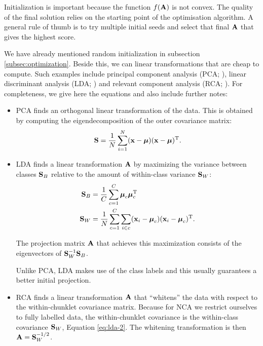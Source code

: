     Initialization is important because the function $f(\mathbf{A})$ is not convex. The quality of the final solution relies on the starting point of the optimisation algorithm. A general rule of thumb is to try multiple initial seeds and select that final $\mathbf{A}$ that gives the highest score.

    We have already mentioned random initialization in subsection \ref{subsec:optimization}. Beside this, we can linear transformations that are cheap to compute. Such examples include  principal component analysis (PCA; \citealp{pearson1901}), linear discriminant analysis (LDA; \citealp{fisher1936}) and relevant component analysis (RCA; \citealp{bar2003}). For completeness, we give here the equations and also include further notes:
        \begin{itemize}
            \item  PCA finds an orthogonal linear
                transformation of the data. This is
                obtained by computing the
                eigendecomposition of the outer covariance
                matrix:
                \begin{align}
                    \mathbf{S} = \frac{1}{N}\sum_{i=1}^N (\mathbf{x}-\mbox{\boldmath $\mu$})(\mathbf{x}-\mbox{\boldmath $\mu$})^\textrm{T}.
                    \label{eq:pca-1}
                \end{align}

            \item LDA finds a linear transformation $\mathbf{A}$ by maximizing the
variance between classes $\mathbf{S}_B$ relative to the amount of within-class variance
$\mathbf{S}_W$:
            \begin{align}
             \mathbf{S}_B &=
\frac{1}{C}\sum_{c=1}^{C}\boldsymbol\mu_c\boldsymbol\mu_c^\textrm{T}\label{eq:lda-1}\\
             \mathbf{S}_W &= \frac{1}{N}\sum_{c=1}^{C}\sum_{i \in
c}(\mathbf{x}_i-\boldsymbol{\mbox{\boldmath $\mu$}}_c)(\mathbf{x}_i-\boldsymbol{\mu}_c)^\textrm{T}.\label{eq:lda-2}
            \end{align}

            The projection matrix $\mathbf{A}$ that achieves this maximization consists
of the eigenvectors of $\mathbf{S}_W^{-1}\mathbf{S}_B$.

            Unlike PCA, LDA makes use of the class labels and this
usually guarantees a better initial projection.

            \item RCA finds a linear transformation $\mathbf{A}$
                that ``whitens'' the data with respect to
                the within-chunklet covariance matrix.
                Because for NCA we restrict ourselves to
                fully labelled data, the within-chunklet
                covariance is the within-class covariance
                $\mathbf{S}_W$, Equation \ref{eq:lda-2}. The
                whitening transformation is then
                $\mathbf{A}=\mathbf{S}_W^{-1/2}$.
        \end{itemize}

